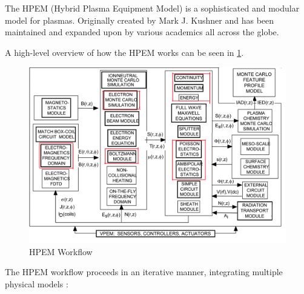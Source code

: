 \documentclass[12pt]{article}
\begin{document}
The HPEM (Hybrid Plasma Equipment Model) is a sophisticated and modular model for plasmas. Originally created by Mark J. Kushner \cite{Kushner2009} and has been maintained and expanded upon by various academics all across the globe.

A high-level overview of how the HPEM works can be seen in \ref{fig:HPEM}.

\begin{figure}[H]
    \centering
    \includegraphics[width=\linewidth]{Figures/HPEM.png}
    \caption{HPEM Workflow}
    \label{fig:HPEM}
\end{figure}

The HPEM workflow proceeds in an iterative manner, integrating multiple physical models \cite{Smith2024,Doyle2024}:
\end{document}
